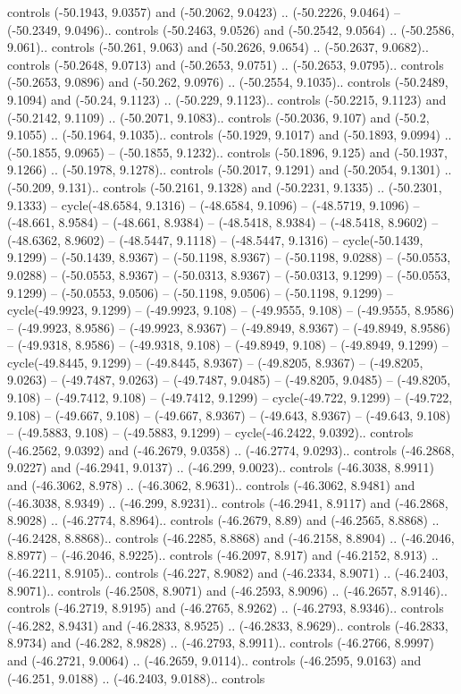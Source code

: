 \begin{scope}[shift={(2.5552, 9.9912)}]
\begin{scope}[shift={(48.1654, -14.8546)}]
controls (-50.1943, 9.0357) and (-50.2062, 9.0423) .. (-50.2226, 9.0464) -- (-50.2349, 9.0496).. controls (-50.2463, 9.0526) and (-50.2542, 9.0564) .. (-50.2586, 9.061).. controls (-50.261, 9.063) and (-50.2626, 9.0654) .. (-50.2637, 9.0682).. controls (-50.2648, 9.0713) and (-50.2653, 9.0751) .. (-50.2653, 9.0795).. controls (-50.2653, 9.0896) and (-50.262, 9.0976) .. (-50.2554, 9.1035).. controls (-50.2489, 9.1094) and (-50.24, 9.1123) .. (-50.229, 9.1123).. controls (-50.2215, 9.1123) and (-50.2142, 9.1109) .. (-50.2071, 9.1083).. controls (-50.2036, 9.107) and (-50.2, 9.1055) .. (-50.1964, 9.1035).. controls (-50.1929, 9.1017) and (-50.1893, 9.0994) .. (-50.1855, 9.0965) -- (-50.1855, 9.1232).. controls (-50.1896, 9.125) and (-50.1937, 9.1266) .. (-50.1978, 9.1278).. controls (-50.2017, 9.1291) and (-50.2054, 9.1301) .. (-50.209, 9.131).. controls (-50.2161, 9.1328) and (-50.2231, 9.1335) .. (-50.2301, 9.1333) -- cycle(-48.6584, 9.1316) -- (-48.6584, 9.1096) -- (-48.5719, 9.1096) -- (-48.661, 8.9584) -- (-48.661, 8.9384) -- (-48.5418, 8.9384) -- (-48.5418, 8.9602) -- (-48.6362, 8.9602) -- (-48.5447, 9.1118) -- (-48.5447, 9.1316) -- cycle(-50.1439, 9.1299) -- (-50.1439, 8.9367) -- (-50.1198, 8.9367) -- (-50.1198, 9.0288) -- (-50.0553, 9.0288) -- (-50.0553, 8.9367) -- (-50.0313, 8.9367) -- (-50.0313, 9.1299) -- (-50.0553, 9.1299) -- (-50.0553, 9.0506) -- (-50.1198, 9.0506) -- (-50.1198, 9.1299) -- cycle(-49.9923, 9.1299) -- (-49.9923, 9.108) -- (-49.9555, 9.108) -- (-49.9555, 8.9586) -- (-49.9923, 8.9586) -- (-49.9923, 8.9367) -- (-49.8949, 8.9367) -- (-49.8949, 8.9586) -- (-49.9318, 8.9586) -- (-49.9318, 9.108) -- (-49.8949, 9.108) -- (-49.8949, 9.1299) -- cycle(-49.8445, 9.1299) -- (-49.8445, 8.9367) -- (-49.8205, 8.9367) -- (-49.8205, 9.0263) -- (-49.7487, 9.0263) -- (-49.7487, 9.0485) -- (-49.8205, 9.0485) -- (-49.8205, 9.108) -- (-49.7412, 9.108) -- (-49.7412, 9.1299) -- cycle(-49.722, 9.1299) -- (-49.722, 9.108) -- (-49.667, 9.108) -- (-49.667, 8.9367) -- (-49.643, 8.9367) -- (-49.643, 9.108) -- (-49.5883, 9.108) -- (-49.5883, 9.1299) -- cycle(-46.2422, 9.0392).. controls (-46.2562, 9.0392) and (-46.2679, 9.0358) .. (-46.2774, 9.0293).. controls (-46.2868, 9.0227) and (-46.2941, 9.0137) .. (-46.299, 9.0023).. controls (-46.3038, 8.9911) and (-46.3062, 8.978) .. (-46.3062, 8.9631).. controls (-46.3062, 8.9481) and (-46.3038, 8.9349) .. (-46.299, 8.9231).. controls (-46.2941, 8.9117) and (-46.2868, 8.9028) .. (-46.2774, 8.8964).. controls (-46.2679, 8.89) and (-46.2565, 8.8868) .. (-46.2428, 8.8868).. controls (-46.2285, 8.8868) and (-46.2158, 8.8904) .. (-46.2046, 8.8977) -- (-46.2046, 8.9225).. controls (-46.2097, 8.917) and (-46.2152, 8.913) .. (-46.2211, 8.9105).. controls (-46.227, 8.9082) and (-46.2334, 8.9071) .. (-46.2403, 8.9071).. controls (-46.2508, 8.9071) and (-46.2593, 8.9096) .. (-46.2657, 8.9146).. controls (-46.2719, 8.9195) and (-46.2765, 8.9262) .. (-46.2793, 8.9346).. controls (-46.282, 8.9431) and (-46.2833, 8.9525) .. (-46.2833, 8.9629).. controls (-46.2833, 8.9734) and (-46.282, 8.9828) .. (-46.2793, 8.9911).. controls (-46.2766, 8.9997) and (-46.2721, 9.0064) .. (-46.2659, 9.0114).. controls (-46.2595, 9.0163) and (-46.251, 9.0188) .. (-46.2403, 9.0188).. controls 
\end{scope}
\end{scope}
